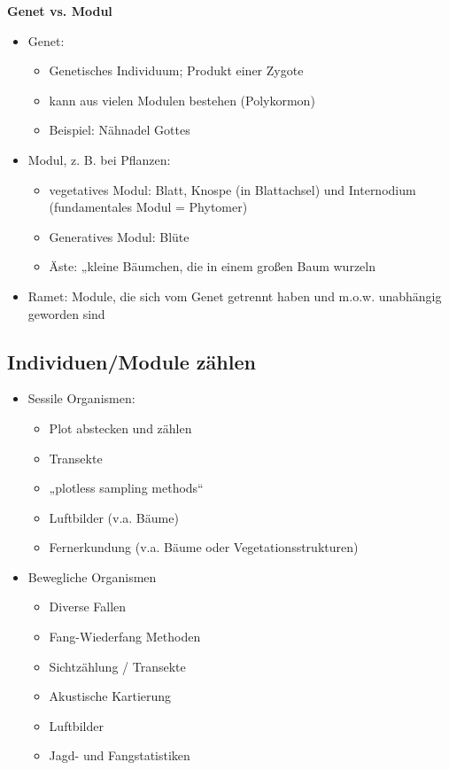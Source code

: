 \newpage
\textbf{Genet vs. Modul}
\begin{itemize}
	\item Genet:
	\begin{itemize}
		\item Genetisches Individuum; Produkt einer Zygote
		\item kann aus vielen Modulen bestehen (Polykormon)
		\item Beispiel: Nähnadel Gottes
	\end{itemize}
	\item Modul, z. B. bei Pflanzen:
	\begin{itemize}
		\item vegetatives Modul: Blatt, Knospe (in Blattachsel) und Internodium (fundamentales Modul = Phytomer)
		\item Generatives Modul: Blüte
		\item Äste: „kleine Bäumchen, die in einem großen Baum wurzeln
	\end{itemize}
	\item Ramet: Module, die sich vom Genet getrennt haben und m.o.w. unabhängig geworden sind
\end{itemize}

\subsection{Individuen/Module zählen}
\begin{itemize}
	\item Sessile Organismen:
	\begin{itemize}
		\item Plot abstecken und zählen
		\item Transekte
		\item „plotless sampling methods“
		\item Luftbilder (v.a. Bäume)
		\item Fernerkundung (v.a. Bäume oder Vegetationsstrukturen)
	\end{itemize}
	\item Bewegliche Organismen
	\begin{itemize}
		\item Diverse Fallen
		\item Fang-Wiederfang Methoden
		\item Sichtzählung / Transekte
		\item Akustische Kartierung
		\item Luftbilder
		\item Jagd- und Fangstatistiken
	\end{itemize}
\end{itemize}

